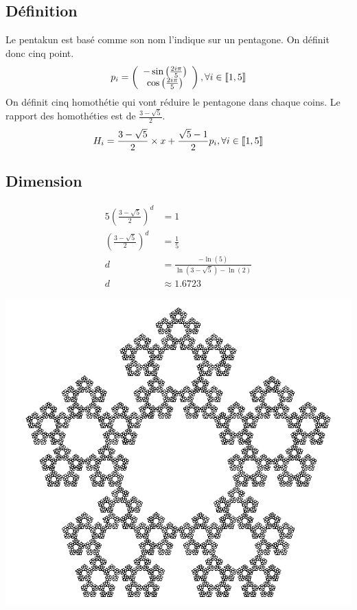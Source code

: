 \documentclass[a4paper, 12pt]{report}
\begin{document}
			\subsection{Définition}
				Le pentakun est basé comme son nom l'indique sur un pentagone. On définit donc cinq point.
				\begin{equation*}
					p_i=\left(\begin{array}{ccc}
							-\sin\left(\frac{2i\pi}{5}\right)\\
							\cos\left(\frac{2i\pi}{5}\right)\\
						\end{array}\right)
						,\forall i\in\textrm{\textlbrackdbl} 1,5\textrm{\textrbrackdbl}
			\end{equation*}
				On définit cinq homothétie qui vont réduire le pentagone dans chaque coins. Le rapport des homothéties est de $\frac{3-\sqrt{5}}{2}$.
				\begin{equation*}
					H_i=\frac{3-\sqrt{5}}{2}\times x+\frac{\sqrt{5}-1}{2}p_i,\forall i\in\textrm{\textlbrackdbl} 1,5\textrm{\textrbrackdbl}
				\end{equation*}
			\subsection{Dimension}
				\begin{align*}
					 5\left(\frac{3-\sqrt{5}}{2}\right)^d	&=1\\
					 \left(\frac{3-\sqrt{5}}{2}\right)^d	&=\frac{1}{5}\\
														d	&=\frac{-\ln(5)}{\ln(3-\sqrt{5})-\ln(2)}\\
														d	&\approx 1.6723
				\end{align*}
				\begin{center}
					\includegraphics[scale=0.5]{Images/pentakun.png}
				\end{center}
				
\end{document}
